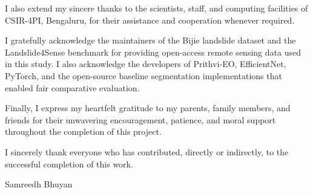 \documentclass[11pt,a4paper,twocolumn]{article}
\begin{document}
I also extend my sincere thanks to the scientists, staff, and computing facilities of CSIR-4PI, Bengaluru, for their assistance and cooperation whenever required.

I gratefully acknowledge the maintainers of the Bijie landslide dataset and the Landslide4Sense benchmark for providing open-access remote sensing data used in this study. I also acknowledge the developers of Prithvi-EO, EfficientNet, PyTorch, and the open-source baseline segmentation implementations that enabled fair comparative evaluation.

Finally, I express my heartfelt gratitude to my parents, family members, and friends for their unwavering encouragement, patience, and moral support throughout the completion of this project.

I sincerely thank everyone who has contributed, directly or indirectly, to the successful completion of this work.

\vspace{1.5em}
\hfill Samreedh Bhuyan

\clearpage
\thispagestyle{empty}
\end{document}

